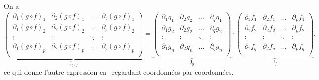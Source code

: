\begin{prv}
	On a \[
		\underbrace{\begin{pmatrix}
			\partial_1 (g \circ f)_1 & \partial_2 (g\circ f)_1 & \ldots & \partial_p(g \circ f)_1 \\
			\partial_1 (g \circ f)_2 & \partial_2 (g\circ f)_2 & \ldots & \partial_p(g \circ f)_2 \\
			\vdots & \vdots & \ddots & \vdots\\
			\partial_1 (g \circ f)_p & \partial_2 (g\circ f)_p & \ldots & \partial_p(g \circ f)_p \\
		\end{pmatrix}}_{\mathrm{J}_{g  \circ f}}
		=
		\underbrace{\begin{pmatrix}
			\partial_1 g_1 & \partial_2 g_2 & \ldots & \partial_q g_1\\
			\partial_1 g_2 & \partial_2 g_2 & \ldots & \partial_q g_2\\
			\vdots & \vdots & \ddots & \vdots\\
			\partial_1 g_n & \partial_2 g_n & \ldots & \partial_q g_n\\
		\end{pmatrix}}_{\mathrm{J}_{g}}
		\cdot
		\underbrace{\begin{pmatrix}
			\partial_1 f_1 & \partial_2 f_1 & \ldots & \partial_p f_1\\
			\partial_1 f_2 & \partial_2 f_2 & \ldots & \partial_p f_2\\
			\vdots & \vdots & \ddots & \vdots\\
			\partial_1 f_q & \partial_2 f_q & \ldots & \partial_p f_q\\
	\end{pmatrix}}_{\mathrm{J}_f}
	,\] ce qui donne l'autre expression en \guillemotleft~regardant coordonnées par coordonnées.~\guillemotright
\end{prv}

